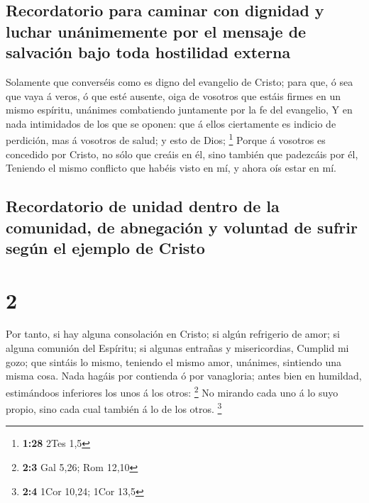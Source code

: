 \hypertarget{recordatorio-para-caminar-con-dignidad-y-luchar-unuxe1nimemente-por-el-mensaje-de-salvaciuxf3n-bajo-toda-hostilidad-externa}{%
\subsection{Recordatorio para caminar con dignidad y luchar unánimemente
por el mensaje de salvación bajo toda hostilidad
externa}\label{recordatorio-para-caminar-con-dignidad-y-luchar-unuxe1nimemente-por-el-mensaje-de-salvaciuxf3n-bajo-toda-hostilidad-externa}}

 Solamente que converséis como es digno del evangelio de
Cristo; para que, ó sea que vaya á veros, ó que esté ausente, oiga de
vosotros que estáis firmes en un mismo espíritu, unánimes combatiendo
juntamente por la fe del evangelio,  Y en nada
intimidados de los que se oponen: que á ellos ciertamente es indicio de
perdición, mas á vosotros de salud; y esto de Dios; \footnote{\textbf{1:28}
  2Tes 1,5}  Porque á vosotros es concedido por Cristo,
no sólo que creáis en él, sino también que padezcáis por él,
 Teniendo el mismo conflicto que habéis visto en mí, y
ahora oís estar en mí.

\hypertarget{recordatorio-de-unidad-dentro-de-la-comunidad-de-abnegaciuxf3n-y-voluntad-de-sufrir-seguxfan-el-ejemplo-de-cristo}{%
\subsection{Recordatorio de unidad dentro de la comunidad, de abnegación
y voluntad de sufrir según el ejemplo de
Cristo}\label{recordatorio-de-unidad-dentro-de-la-comunidad-de-abnegaciuxf3n-y-voluntad-de-sufrir-seguxfan-el-ejemplo-de-cristo}}

\hypertarget{section-1}{%
\section{2}\label{section-1}}

 Por tanto, si hay alguna consolación en Cristo; si algún
refrigerio de amor; si alguna comunión del Espíritu; si algunas entrañas
y misericordias,  Cumplid mi gozo; que sintáis lo mismo,
teniendo el mismo amor, unánimes, sintiendo una misma cosa.
 Nada hagáis por contienda ó por vanagloria; antes bien en
humildad, estimándoos inferiores los unos á los otros: \footnote{\textbf{2:3}
  Gal 5,26; Rom 12,10}  No mirando cada uno á lo suyo
propio, sino cada cual también á lo de los otros. \footnote{\textbf{2:4}
  1Cor 10,24; 1Cor 13,5}

